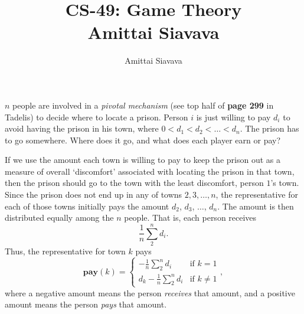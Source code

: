 \documentclass[11pt, reqno]{amsart}
\begin{document}

\title{CS-49: Game Theory\\ Amittai Siavava \\ }
\author{Amittai Siavava}


\setlength{\headheight}{13.0pt}
\setlength{\footskip}{15.0pt}

\maketitle

\bigskip

\def \cram { \textsc{cram} }
\def \dom { \textsc{domineering} }
\def \sub { \textsc{subtraction} }
\def \weighted { \textsc{weighted odds and evens}}
\def \nim { \textsc{nim} }
\def \P { \mathbf{P}}
\def \N { \mathbf{N}}
\def \cc { \mathbf{cc} }
\def \hackenbush { \textsc{LR hackenbush} }
\def \clobber { \textsc{clobber} }

  \begin{problem}[25]
    $n$ people are involved in a \emph{pivotal mechanism} (see top half of \textbf{page 299} in Tadelis)
    to decide where to locate a prison. Person $i$ is just willing to pay $d_i$ to avoid having the prison in his town,
    where $0 < d_1 < d_2 < \ldots < d_n$.
    The prison has to go somewhere.
    Where does it go, and what does each player earn or pay?

    \step
    If we use the amount each town is willing to pay to keep the prison out as a measure of overall `discomfort'
    associated with locating the prison in that town, then the prison should go to the town with the least discomfort,
    person $1$'s town.
    Since the prison does not end up in any of towns $2, 3, \ldots, n$, the representative for each of those towns
    initially pays the amount $d_2$, $d_3$, $\ldots$, $d_n$. The amount is then distributed equally among the $n$ people.
    That is, each person receives \[ \frac{1}{n} \sum_{2}^{n} d_i. \]
    Thus, the representative for town $k$ pays
    \[
      \mathbf{pay}(k) = \begin{cases}
        - \frac{1}{n} \sum_{2}^{n} d_i & \text{if $k = 1$} \\
        d_k - \frac{1}{n} \sum_{2}^{n} d_i & \text{if $k \neq 1$}
      \end{cases},
    \]
    where a negative amount means the person \emph{receives} that amount, and a positive amount means 
    the person \emph{pays} that amount.
  \end{problem}
\end{document}
